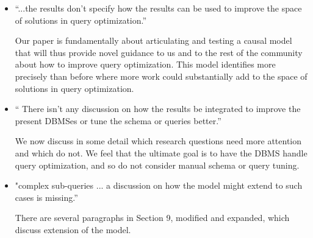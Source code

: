 \documentclass{sig-alternate}
\begin{document}
\vspace{2ex}
\begin{itemize}
\item ``...the results don't specify how the results can be used to improve
  the space of solutions in query optimization.''

Our paper is fundamentally about articulating and testing a causal model
that will thus provide novel guidance to us and to the rest of the community
about how to improve query optimization. This model identifies more
precisely than before where more work could substantially add to the space
of solutions in query optimization.

\item `` There isn't any discussion on
  how the results be integrated to improve the present DBMSes or tune the
  schema or queries better.''

We now discuss in some detail which research questions need more attention
and which do not. We feel that the ultimate goal is to have the DBMS handle
query optimization, and so do not consider manual schema or query tuning.

\item "complex sub-queries ... a discussion on how the model might extend to
  such cases is missing.''

There are several paragraphs in Section 9, modified and expanded, which discuss extension
of the model.

\end{itemize}
\end{document}
